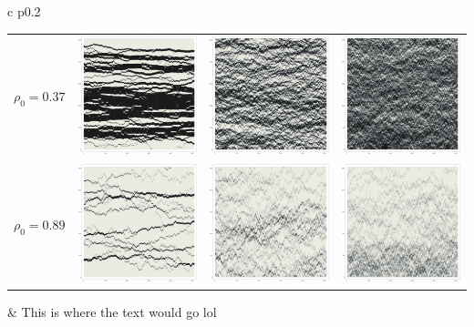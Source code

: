 \documentclass[landscape,a0paper,fontscale=0.285]{baposter} %
\begin{document}
\begin{poster}
{\begin{center}
\begin{tabular}{c p{0.2\linewidth}}
\begin{tabular}{c|c@{\hspace{0.5em}}c@{\hspace{0.5em}}c  }
   $\rho_0=0.37$ & \includegraphics[width=0.2\linewidth]{figures/r_37l_01} & \includegraphics[width=0.2\linewidth]{figures/r_37l_14} & \includegraphics[width=0.2\linewidth]{figures/r_37l_54} \\
   $\rho_0=0.89$ & \includegraphics[width=0.2\linewidth]{figures/r_89l_01} & \includegraphics[width=0.2\linewidth]{figures/r_89l_14} & \includegraphics[width=0.2\linewidth]{figures/r_89l_54} \\
\end{tabular}
&
This is where the text would go lol \\
\end{tabular}
\end{center}
}


\end{poster}
\end{document}

